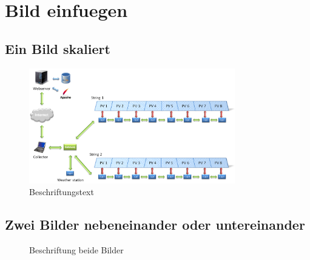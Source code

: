 \documentclass{wissdoc}
\begin{document}
\section{Bild einfuegen}

\subsection{Ein Bild skaliert}

\begin{figure}[htbp]%
	\centering
		\includegraphics[width=0.80\textwidth]{../figures/large1.png}
	\caption{Beschriftungstext}
	\label{fig:large1}
\end{figure}

\subsection{Zwei Bilder nebeneinander oder untereinander}
\begin{figure}[!htb]
	\centering
 	\caption{Beschriftung beide Bilder} 
	\label{fig:beidebilder}
\end{figure}
\end{document}
